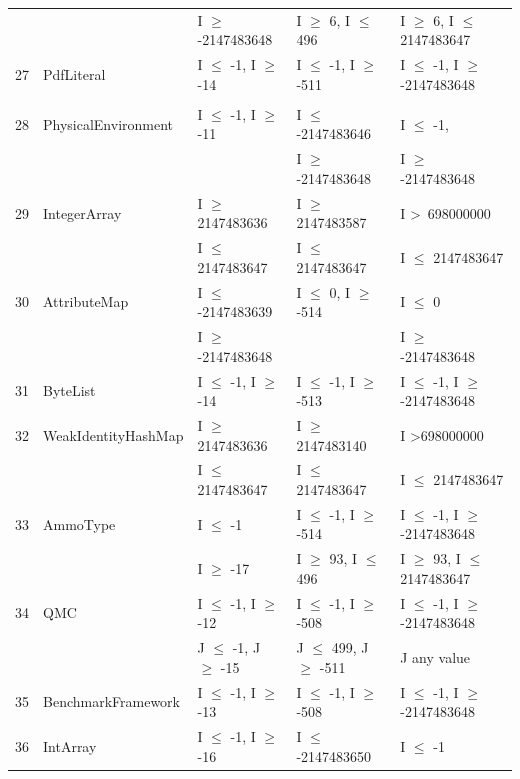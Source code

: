 {\begin{longtable}{|l|l|l|l|l|}
	&                                             & I $\ge$ -2147483648			& I $\ge$ 6, I $\le$ 496			& I $\ge$ 6,  I $\le$ 2147483647	\\	
27	& PdfLiteral					& I $\le$ -1, I $\ge$ -14			& I $\le$ -1, I $\ge$ -511			& I $\le$ -1, I $\ge$ -2147483648	\\ 
	&							&								&								&									\\
28	& PhysicalEnvironment		& I $\le$ -1, I $\ge$ -11			& I $\le$ -2147483646			& I $\le$ -1, 							\\ 
	& 							& 								& I $\ge$ -2147483648 			& I $\ge$ -2147483648				\\ 
29	& IntegerArray				& I $\ge$ 2147483636			& I $\ge$ 2147483587			& I \textgreater~698000000					\\ 
	&                                             & I $\le$ 2147483647			& I $\le$ 2147483647			&  I $\le$ 2147483647					\\	
30	& AttributeMap				& I $\le$ -2147483639			& I $\le$ 0, I $\ge$ -514			& I $\le$ 0								\\ 
	&                                             & I $\ge$ -2147483648			& 								& I $\ge$ -2147483648 			   	\\	
31	& ByteList					& I $\le$ -1, I $\ge$ -14			& I $\le$ -1, I $\ge$ -513			& I $\le$ -1, I $\ge$ -2147483648	\\ 
32	& WeakIdentityHashMap		& I $\ge$ 2147483636			& I $\ge$ 2147483140			& I \textgreater 698000000					\\ 
	&                                             & I $\le$ 2147483647			& I $\le$ 2147483647			& I $\le$ 2147483647					\\
33	& AmmoType				& I $\le$ -1						& I $\le$ -1, I $\ge$ -514			& I $\le$ -1, I $\ge$ -2147483648	\\ 			
	&                                             & I $\ge$ -17					& I $\ge$ 93, I $\le$ 496			& I $\ge$ 93, 	I $\le$ 2147483647	\\
34	& QMC						& I $\le$ -1, I $\ge$ -12			& I $\le$ -1, I $\ge$ -508			& I $\le$ -1, I $\ge$ -2147483648	\\ 
	&                                             & J $\le$ -1, J $\ge$ -15			& J $\le$ 499, J $\ge$ -511		& J any value			 		  				\\	
35	& BenchmarkFramework		& I $\le$ -1, I $\ge$ -13			& I $\le$ -1, I $\ge$ -508			& I $\le$ -1, I $\ge$ -2147483648	\\ 
36	& IntArray					& I $\le$ -1, I $\ge$ -16			& I $\le$ -2147483650			& I $\le$ -1								\\ 

\end{longtable}}
